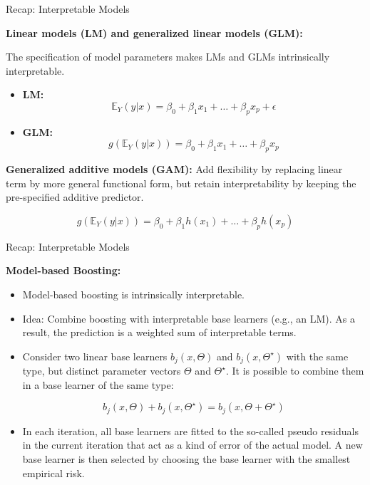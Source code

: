 \documentclass[11pt,compress,t,notes=noshow, xcolor=table]{beamer}
\begin{document}
\begin{vbframe}{Recap: Interpretable Models}


\textbf{Linear models (LM) and generalized linear models (GLM):}

The specification of model parameters makes LMs and GLMs intrinsically interpretable.

\begin{itemize}

\item \textbf{LM:}
$$
\mathbb{E}_Y(y \vert x) = \beta_0 + \beta_1 x_1 + \dots + \beta_p x_p + \epsilon
$$

\item \textbf{GLM:}
$$
g\left(\mathbb{E}_Y(y \vert x)\right) = \beta_0 + \beta_1 x_1 + \dots + \beta_p x_p
$$
\end{itemize}


\textbf{Generalized additive models (GAM):} Add flexibility by replacing linear term by more general functional form, but retain interpretability by keeping the pre-specified additive predictor.

$$
g\left(\mathbb{E}_Y(y \vert x)\right) = \beta_0 + \beta_1 h(x_1) + \dots + \beta_p h(x_p)
$$

\end{vbframe}

\begin{vbframe}{Recap: Interpretable Models}


\textbf{Model-based Boosting:}



\begin{itemize}
\item Model-based boosting is intrinsically interpretable.

\item 
Idea: Combine boosting with interpretable base learners (e.g., an LM). As a result, the prediction is a weighted sum of interpretable terms.

\item
Consider two linear base learners $b_j(x, \Theta)$ and $b_j(x, \Theta^{\star})$ with the same type, but distinct parameter vectors $\Theta$ and $\Theta^{\star}$. It is possible to combine them in a base learner of the same type:

$$
b_j(x, \Theta) + b_j(x, \Theta^{\star}) = b_j(x, \Theta + \Theta^{\star})
$$

\item In each iteration, all base learners are fitted to the so-called pseudo residuals in the current iteration that act as a kind of error of the actual model. A new base learner is then selected by choosing the base learner with the smallest empirical risk.
\end{itemize}



\end{vbframe}
\end{document}
